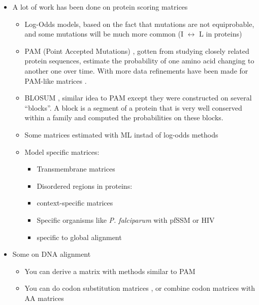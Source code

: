 \documentclass[
  11pt,
  twoside]{scrbook}
\providecommand{\tightlist}{%
  \setlength{\itemsep}{0pt}\setlength{\parskip}{0pt}}
\begin{document}
\begin{itemize}
\item
  A lot of work has been done on protein scoring matrices

  \begin{itemize}
  \item
    Log-Odds models, based on the fact that mutations are not equiprobable, and some mutations will be much more common (I \(\leftrightarrow\) L in proteins)
  \item
    PAM (Point Accepted Mutations) \autocite{dayhoffModelEvolutionaryChange1978}, gotten from studying closely related protein sequences, estimate the probability of one amino acid changing to another one over time. With more data refinements have been made for PAM-like matrices \autocite{mullerModelingAminoAcid2000}.
  \item
    BLOSUM \autocite{henikoffAminoAcidSubstitution1992}, similar idea to PAM except they were constructed on several ``blocks''. A block is a segment of a protein that is very well conserved within a family and computed the probabilities on these blocks.
  \item
    Some matrices estimated with ML instad of log-odds methods \autocite{whelanGeneralEmpiricalModel2001,leImprovedGeneralAmino2008}
  \item
    Model specific matrices:

    \begin{itemize}
    \item
      Transmembrane matrices \autocite{mullerNonsymmetricScoreMatrices2001,ngPHATTransmembranespecificSubstitution2000}
    \item
      Disordered regions in proteins: \autocite{trivediAminoAcidSubstitution2019}
    \item
      context-specific matrices \autocite{goonesekereContextspecificAminoAcid2008}
    \item
      Specific organisms like \emph{P. falciparum} with pfSSM \autocite{pailaGenomeBiasInfluences2008} or HIV \autocite{nickleHIVSpecificProbabilisticModels2007}
    \item
      specific to global alignment \autocite{sardiuScoreStatisticsGlobal2005}
    \end{itemize}
  \end{itemize}
\item
  Some on DNA alignment

  \begin{itemize}
  \tightlist
  \item
    You can derive a matrix with methods similar to PAM \autocite{chiaromonteScoringPairwiseGenomic2001}
  \item
    You can do codon substitution matrices \autocite{schneiderEmpiricalCodonSubstitution2005}, or combine codon matrices with AA matrices \autocite{doron-faigenboimCombinedEmpiricalMechanistic2007}
  \end{itemize}
\end{itemize}
\end{document}
